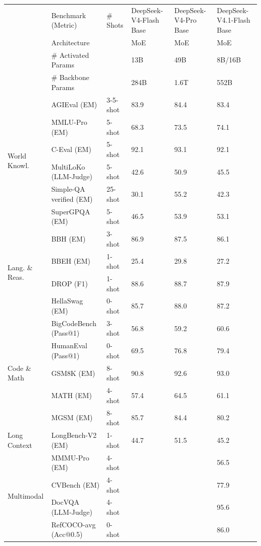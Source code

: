 \documentclass[
  10
]{article}
\newcounter{none} %
\begin{document}
{\def\LTcaptype{none} %
\begin{longtable}[]{@{}llllll@{}}
\toprule\noalign{}
\endhead
\bottomrule\noalign{}
\endlastfoot
& Benchmark (Metric) & \# Shots & DeepSeek-V4-Flash Base &
DeepSeek-V4-Pro Base & DeepSeek-V4.1-Flash Base \\
\multirow{3}{*}{} & Architecture & & MoE & MoE & MoE \\
& \# Activated Params & & 13B & 49B & 8B/16B \\
& \# Backbone Params & & 284B & 1.6T & 552B \\
\multirow{6}{*}{World Knowl.} & AGIEval (EM) & 3-5-shot & 83.9 & 84.4 &
83.4 \\
& MMLU-Pro (EM) & 5-shot & 68.3 & 73.5 & 74.1 \\
& C-Eval (EM) & 5-shot & 92.1 & 93.1 & 92.1 \\
& MultiLoKo (LLM-Judge) & 5-shot & 42.6 & 50.9 & 45.5 \\
& Simple-QA verified (EM) & 25-shot & 30.1 & 55.2 & 42.3 \\
& SuperGPQA (EM) & 5-shot & 46.5 & 53.9 & 53.1 \\
\multirow{4}{*}{Lang. \& Reas.} & BBH (EM) & 3-shot & 86.9 & 87.5 &
86.1 \\
& BBEH (EM) & 1-shot & 25.4 & 29.8 & 27.2 \\
& DROP (F1) & 1-shot & 88.6 & 88.7 & 87.9 \\
& HellaSwag (EM) & 0-shot & 85.7 & 88.0 & 87.2 \\
\multirow{5}{*}{Code \& Math} & BigCodeBench (Pass@1) & 3-shot & 56.8 &
59.2 & 60.6 \\
& HumanEval (Pass@1) & 0-shot & 69.5 & 76.8 & 79.4 \\
& GSM8K (EM) & 8-shot & 90.8 & 92.6 & 93.0 \\
& MATH (EM) & 4-shot & 57.4 & 64.5 & 61.1 \\
& MGSM (EM) & 8-shot & 85.7 & 84.4 & 80.2 \\
Long Context & LongBench-V2 (EM) & 1-shot & 44.7 & 51.5 & 45.2 \\
\multirow{4}{*}{Multimodal} & MMMU-Pro (EM) & 4-shot & & & 56.5 \\
& CVBench (EM) & 4-shot & & & 77.9 \\
& DocVQA (LLM-Judge) & 4-shot & & & 95.6 \\
& RefCOCO-avg (Acc@0.5) & 0-shot & & & 86.0 \\
\end{longtable}
}
\end{document}

